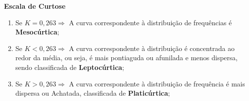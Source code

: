 \textbf{Escala de Curtose}

\begin{enumerate}
\item Se $K = 0,263 \Rightarrow$  A curva correspondente à distribuição de frequências é \textbf{Mesocúrtica};
\item Se $K < 0,263 \Rightarrow$  A curva correspondente à distribuição é concentrada ao redor da média, ou seja, é mais pontiaguda ou afunilada e menos dispersa, sendo classificada de \textbf{Leptocúrtica};
\item Se $K > 0,263 \Rightarrow$ A curva correspondente à distribuição de frequência é mais dispersa ou Achatada, classificada de \textbf{Platicúrtica};
\end{enumerate}
